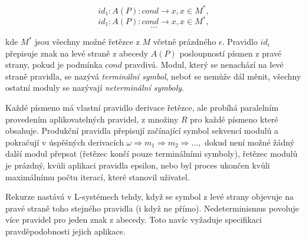 \[id_1:A(P):cond\rightarrow x,x \in M^*,\]
\[id_1:A(P):cond\rightarrow x,x \in M^*,\]
\[\ldots\]

kde $M^*$ jsou všechny možné řetězce z $M$ včetně prázdného $\epsilon$. Pravidlo $id_i$ přepisuje znak na levé straně z abecedy $A(P)$ posloupností písmen z pravé strany, pokud je podmínka $cond$ pravdivá. Modul, který se nenachází na levé straně pravidla, se nazývá \textit{terminální symbol}, neboť se nemůže dál měnit, všechny ostatní moduly se nazývají \textit{neterminální symboly}.\cite{prusinkiewicz2012algorithmic}

Každé písmeno má vlastní pravidlo derivace řetězce, ale probíhá paralelním provedením aplikovatelných pravidel, z množiny $R$ pro každé písmeno které obsahuje. Produkční pravidla přepisují začínající symbol sekvencí modulů a pokračují v úspěšných derivacích $\omega \Rightarrow m_1 \Rightarrow m_2 \Rightarrow \ldots,$ dokud není možné žádný další modul přepsat (řetězec končí pouze terminálními symboly), řetězec modulů je prázdný, kvůli aplikaci pravidla epsilon, nebo byl proces ukončen kvůli maximálnímu počtu iterací, které stanovil uživatel.\cite{lindenmayer1968mathematical}

Rekurze nastává v L-systémech tehdy, když se symbol z levé strany objevuje na pravé straně toho stejného pravidla (i když ne přímo). Nedeterminismus povoluje více pravidel pro jeden znak z abecedy. Toto navíc vyžaduje specifikaci pravděpodobnosti jejich aplikace.\cite{LINDENMAYER1968280}

